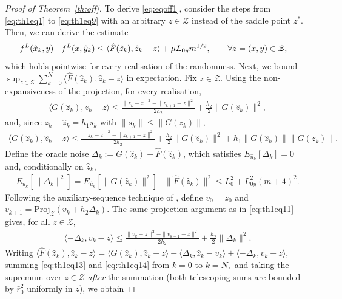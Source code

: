 \documentclass{article}
\theoremstyle{plain}
\theoremstyle{definition}
\theoremstyle{remark}
\begin{document}
\begin{proof}[Proof of Theorem~\ref{th:off}]
    To derive \eqref{eq:eqoff1}, consider 
    the steps from \eqref{eq:th1eq1} to \eqref{eq:th1eq9} with an arbitrary $z\in\mathcal{Z}$ instead of the saddle point $z^\ast.$ Then, we 
    can derive the estimate
    \begin{align}
        \label{eq:th1eq12}
       f^L(\hat{x}_k,y) \hspace{-0.05cm}-\hspace{-0.05cm}f^L(x,\hat{y}_k) &\leq\langle \hat{F}(\hat{z}_k),\hat{z}_k-z\rangle+\mu L_{0y}m^{1/2}, \qquad \forall z=(x,y)\in\mathcal{Z},
    \end{align}
    which holds pointwise for every realisation of the randomness.
    Next, we bound $\sup_{z\in\mathcal{Z}}\sum_{k=0}^N\langle \hat{F}(\hat{z}_k),\hat{z}_k-z\rangle$ in expectation. Fix $z\in\mathcal{Z}$. Using the non-expansiveness of the projection, for every realisation,
    \begin{align}\label{eq:th1eq11}
        \langle G(\hat{z}_k),z_k-z\rangle \leq \frac{\|z_k-z\|^2-\|z_{k+1}-z\|^2}{2h_2}+\frac{h_2}{2}\|G(\hat{z}_k)\|^2,
    \end{align}
    and, since $z_k-\hat{z}_k=h_1s_k$ with $\|s_k\|\leq\|G(z_k)\|,$
    \begin{align}\label{eq:th1eq13}
        \langle G(\hat{z}_k),\hat{z}_k-z\rangle \leq \frac{\|z_k-z\|^2-\|z_{k+1}-z\|^2}{2h_2}+\frac{h_2}{2}\|G(\hat{z}_k)\|^2+h_1\|G(\hat{z}_k)\|\|G(z_k)\|.
    \end{align}
    Define the oracle noise $\Delta_k := G(\hat{z}_k)-\hat{F}(\hat{z}_k)$, which satisfies $E_{\hat{u}_k}[\Delta_k]=0$ and, conditionally on $\hat{z}_k$,
    \begin{align*}
        E_{\hat{u}_k}[\|\Delta_k\|^2]=E_{\hat{u}_k}[\|G(\hat{z}_k)\|^2]-\|\hat{F}(\hat{z}_k)\|^2\leq L_0^2+L_{0y}^2(m+4)^2.
    \end{align*}
    Following the auxiliary-sequence technique of \citet[Lem.~6.1, used there to prove Lem.~3.1]{nemirovski2009robust}, define $v_0=z_0$ and $v_{k+1}=\mathrm{Proj}_{\mathcal{Z}}(v_k+h_2\Delta_k).$ The same projection argument as in \eqref{eq:th1eq11} gives, for all $z\in\mathcal{Z},$
    \begin{align}\label{eq:th1eq14}
        \langle -\Delta_k,v_k-z\rangle \leq \frac{\|v_k-z\|^2-\|v_{k+1}-z\|^2}{2h_2}+\frac{h_2}{2}\|\Delta_k\|^2.
    \end{align}
    Writing $\langle \hat{F}(\hat{z}_k),\hat{z}_k-z\rangle=\langle G(\hat{z}_k),\hat{z}_k-z\rangle-\langle \Delta_k,\hat{z}_k-v_k\rangle+\langle -\Delta_k,v_k-z\rangle,$ summing \eqref{eq:th1eq13} and \eqref{eq:th1eq14} from $k=0$ to $k=N,$ and taking the supremum over $z\in\mathcal{Z}$ \emph{after} the summation (both telescoping sums are bounded by $\bar{r}_0^2$ uniformly in $z$), we obtain

\end{proof}
\end{document}
